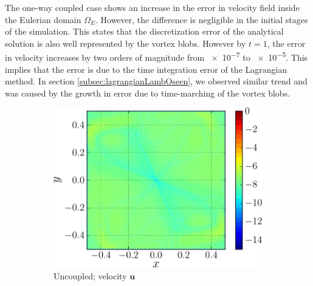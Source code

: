 The one-way coupled case shows an increase in the error in velocity field inside the Eulerian domain $\Omega_E$. However, the difference is negligible in the initial stages of the simulation. This states that the discretization error of the analytical solution is also well represented by the vortex blobs. However by $t=1$, the error in velocity increases by two orders of magnitude from \num{e-7} to \num{e-5}. This implies that the error is due to the time integration error of the Lagrangian method. In section \ref{subsec:lagrangianLambOseen}, we observed similar trend and was caused by the growth in error due to time-marching of the vortex blobs.

	\begin{figure}[!p]
     \centering
     \begin{subfigure}[t]{0.45\textwidth}
             \includegraphics[width=\linewidth]{./figures/hybrid/lambOseent2/lambOseen_uncoupled_vErrorFinal_compressed-crop.pdf}
             \caption{Uncoupled; velocity $\mathbf{u}$}
             \label{fig:lambOseen_uncoupled_vErrorFinal}
     \end{subfigure}%
     \qquad %
     \begin{subfigure}[t]{0.45\textwidth}

\end{subfigure}
\end{figure}
